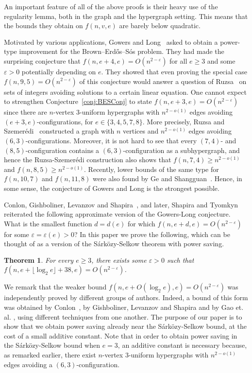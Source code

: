 \documentclass{daj}
\def\eps{\varepsilon}
\theoremstyle{plain}
\newtheorem{theorem}{Theorem}[section]
\theoremstyle{remark}
\begin{document}
An important feature of all of the above proofs is their heavy use of the regularity lemma, both in the graph and the hypergraph setting. This means that the bounds they obtain on $f(n, v, e)$ are barely below quadratic. 

Motivated by various applications, Gowers and Long~\cite{GL21} asked to obtain a power-type improvement for the Brown--Erd\H os--S\'os problem.
They had made the surprising conjecture that $f(n, e+4, e)=O(n^{2-\eps})$ for all $e\geq 3$ and some $\eps>0$ potentially depending on $e$. 
They showed that even proving the special case $f(n,9,5)=O(n^{2-\eps})$ of this conjecture would answer a question of Ruzsa~\cite{ruzsa1993solving} on sets of integers avoiding solutions to a certain linear equation.
One cannot expect to strengthen Conjecture~\ref{conj:BESConj} to state $f(n, e+3, e)=O(n^{2-\eps})$ since there are $n$-vertex $3$-uniform hypergraphs with $n^{2-o(1)}$ edges avoiding $(e+3, e)$-configurations, for $e\in \{3, 4, 5, 7, 8\}$. More precisely, Ruzsa and Szemer\'edi~\cite{RS76} constructed a graph with $n$ vertices and $n^{2-o(1)}$ edges avoiding $(6, 3)$-configurations. Moreover, it is not hard to see that every $(7, 4)$- and $(8, 5)$-configuration contains a $(6, 3)$-configuration as a subhypergraph, and hence the Ruzsa-Szemer\'edi construction also shows that $f(n, 7, 4)\geq n^{2-o(1)}$ and $f(n, 8, 5)\geq n^{2-o(1)}$. Recently, lower bounds of the same type for $f(n, 10, 7)$ and $f(n, 11, 8)$ were also found by Ge and Shangguan~\cite{GS21}. Hence, in some sense, the conjecture of Gowers and Long is the strongest possible.

Conlon, Gishboliner, Levanzov and Shapira~\cite{CGLS23}, and later, Shapira and Tyomkyn~\cite{ST23} reiterated the following approximate version of the Gowers-Long conjecture. 
What is the smallest function $d=d(e)$ for which $f(n, e+d, e)=O(n^{2-\eps})$ for some $\eps = \eps(e)>0$? In this paper we prove the following, which can be thought of as a version of the S\'ark\"ozy-Selkow theorem with power saving.

\begin{theorem}\label{thm:power saving}
For every $e \ge 3$, there exists some $\eps>0$ such that $f(n, e+\lfloor \log_2 e\rfloor+38, e)=O(n^{2-\eps})$.
\end{theorem}

We remark that the weaker bound $f(n,e+O(\log_2 e),e)=O(n^{2-\eps})$ was independently proved by different groups of authors. Indeed, a bound of this form was obtained by Conlon~\cite{Conprivate}, by Gishboliner, Levanzov and Shapira \cite{GLSprivate} and by Gao et. al. \cite{Gaoetal}, using different techniques from one another. The purpose of our paper is to show that we obtain power saving already near the S\'ark\"ozy-Selkow bound, at the cost of a small additive constant. Note that in order to obtain power saving in the S\'ark\"ozy-Selkow bound when $e = 3$, an additive constant is necessary because, as remarked earlier, there exist $n$-vertex $3$-uniform hypergraphs with $n^{2-o(1)}$ edges avoiding a $(6, 3)$-configuration.
\end{document}
